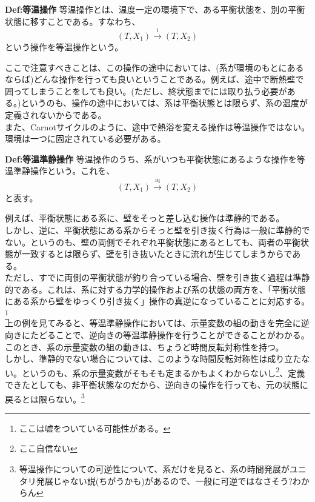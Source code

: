 \documentclass[a4paper,11pt]{jsarticle}
\numberwithin{equation}{section}
\begin{document}
\begin{itembox}[l]{\textbf{Def:等温操作}}
    等温操作とは、温度一定の環境下で、ある平衡状態を、別の平衡状態に移すことである。すなわち、
    \begin{equation}
        (T,X_1) \xrightarrow{\text{i}} (T,X_2)
    \end{equation}
    という操作を等温操作という。
\end{itembox}
ここで注意すべきことは、この操作の途中においては、(系が環境のもとにあるならば)どんな操作を行っても良いということである。例えば、途中で断熱壁で囲ってしまうことをしても良い。(ただし、終状態までには取り払う必要がある。)というのも、操作の途中においては、系は平衡状態とは限らず、系の温度が定義されないからである。\\
また、Carnotサイクルのように、途中で熱浴を変える操作は等温操作ではない。環境は一つに固定されている必要がある。\\

\begin{itembox}[l]{\textbf{Def:等温準静操作}}
    等温操作のうち、系がいつも平衡状態にあるような操作を等温準静操作という。これを、
    \begin{equation}
        (T,X_1) \xrightarrow{\text{iq}} (T,X_2)
    \end{equation}
    と表す。
\end{itembox}
例えば、平衡状態にある系に、壁をそっと差し込む操作は準静的である。\\
しかし、逆に、平衡状態にある系からそっと壁を引き抜く行為は一般に準静的でない。というのも、壁の両側でそれぞれ平衡状態にあるとしても、両者の平衡状態が一致するとは限らず、壁を引き抜いたときに流れが生じてしまうからである。\\
ただし、すでに両側の平衡状態が釣り合っている場合、壁を引き抜く過程は準静的である。これは、系に対する力学的操作および系の状態の両方を、「平衡状態にある系から壁をゆっくり引き抜く」操作の真逆になっていることに対応する。\footnote{ここは嘘をついている可能性がある。}\\

上の例を見てみると、等温準静操作においては、示量変数の組の動きを完全に逆向きにたどることで、逆向きの等温準静操作を行うことができることがわかる。このとき、系の示量変数の組の動きは、ちょうど時間反転対称性を持つ。\\
しかし、準静的でない場合については、このような時間反転対称性は成り立たない。というのも、系の示量変数がそもそも定まるかもよくわからないし\footnote{ここ自信ない}、定義できたとしても、非平衡状態なのだから、逆向きの操作を行っても、元の状態に戻るとは限らない。\footnote{等温操作についての可逆性について、系だけを見ると、系の時間発展がユニタリ発展じゃない説(ちがうかも)があるので、一般に可逆ではなさそう?わからん}
\end{document}

